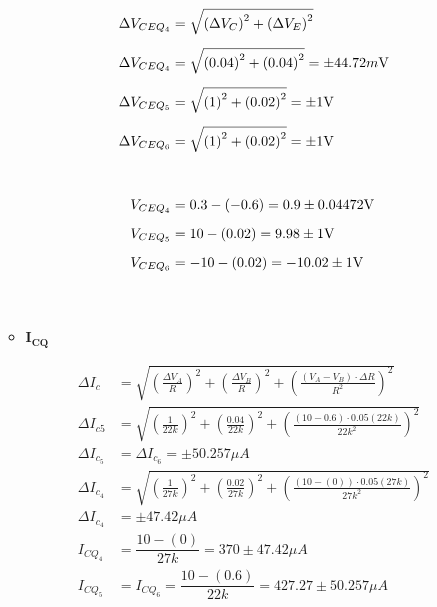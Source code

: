 \begin{enumerate}
\begin{itemize}
                \begin{align*}
                  \Delta V_{CEQ_4} & = \sqrt{\left(\Delta V_C\right)^2 + \left(\Delta V_E\right)^2}     \\[0.2cm]
                  \Delta V_{CEQ_4} & = \sqrt{\left(0.04\right)^2 + \left(0.04\right)^2}=\pm 44.72m\volt \\[0.2cm]
                  \Delta V_{CEQ_5} & = \sqrt{\left(1\right)^2 + \left(0.02\right)^2}=\pm 1\volt         \\[0.2cm]
                  \Delta V_{CEQ_6} & = \sqrt{\left(1\right)^2 + \left(0.02\right)^2}=\pm 1\volt         \\[1cm]
                  V_{CEQ_4}        & =0.3-(-0.6)=0.9 \pm 0.04472\volt                                   \\[0.2cm]
                  V_{CEQ_5}        & =10-(0.02)=9.98 \pm 1\volt                                         \\[0.2cm]
                  V_{CEQ_6}        & =-10-(0.02)=-10.02 \pm 1\volt                                      \\[1cm]
                \end{align*}


          \item $\mathbf{I_{CQ}}$

                \begin{align*}
                  \Delta I_{c}   & = \sqrt{\left(\frac{\Delta V_{A}}{R}\right)^2 + \left(\frac{\Delta V_{B}}{R}\right)^2 + \left(\frac{(V_{A} - V_{B}) \cdot \Delta R}{R^2}\right)^2} \\[0.2cm]
                  \Delta I_{c5}  & = \sqrt{\left(\frac{1}{22k}\right)^2 + \left(\frac{0.04}{22k}\right)^2 + \left(\frac{(10-0.6) \cdot 0.05(22k)}{22k^2}\right)^2}                    \\[0.2cm]
                  \Delta I_{c_5} & =\Delta I_{c_6} =\pm 50.257\mu A                                                                                                                   \\[0.2cm]
                  \Delta I_{c_4} & = \sqrt{\left(\frac{1}{27k}\right)^2 + \left(\frac{0.02}{27k}\right)^2 + \left(\frac{(10-(0)) \cdot 0.05(27k)}{27k^2}\right)^2}                    \\[0.2cm]
                  \Delta I_{c_4} & =\pm 47.42\mu A                                                                                                                                    \\[1cm]
                  I_{CQ_4}       & =\dfrac{10-(0)}{27k}=370 \pm 47.42\mu A                                                                                                            \\[0.2cm]
                  I_{CQ_5}       & = I_{CQ_6}=\dfrac{10-(0.6)}{22k}=427.27 \pm 50.257\mu A                                                                                            \\[0.2cm]
                \end{align*}
        \end{itemize}


\end{enumerate}
